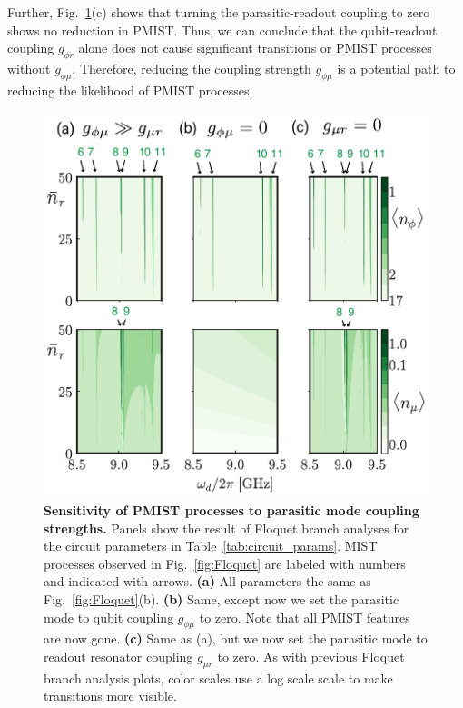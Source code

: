\documentclass[%
reprint,
superscriptaddress,
 amsmath,amssymb,
 aps,
 prx,
longbibliography,
floatfix,
]{revtex4-2}
\begin{document}
Further, Fig.~\ref{fig:coupling-Floquet}(c) shows that turning the parasitic-readout coupling to zero shows no reduction in PMIST. Thus, we can conclude that the qubit-readout coupling $g_{\phi r}$ alone does not cause significant transitions or PMIST processes without $g_{\phi \mu}$. Therefore, reducing the coupling strength $g_{\phi \mu}$ is a potential path to reducing the likelihood of PMIST processes. 
\begin{figure}[t]
    \centering
    \includegraphics[width=\linewidth]{Figures/Floquet_coupling.pdf}
    \caption{
    {\bf Sensitivity of PMIST processes to parasitic mode coupling strengths.} Panels show the result of Floquet branch analyses for the circuit parameters in Table~\ref{tab:circuit_params}. MIST processes observed in Fig.~\ref{fig:Floquet} are labeled with numbers and indicated with arrows. \textbf{(a)} All parameters the same as Fig.~\ref{fig:Floquet}(b). \textbf{(b)} Same, except now we set the parasitic mode to qubit coupling $g_{\phi \mu}$ to zero.  Note that all PMIST features are now gone.  \textbf{(c)} Same as (a), but we now set the parasitic mode to readout resonator coupling $g_{\mu r}$ to zero.  As with previous Floquet branch analysis plots, color scales use a log scale scale to make transitions more visible.}
    \label{fig:coupling-Floquet}
\end{figure}
\end{document}
